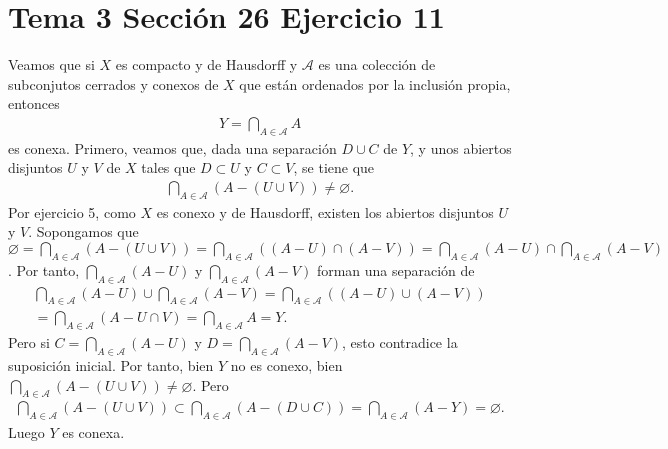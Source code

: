 \documentclass{article}
\begin{document}
\section{Tema 3 Sección 26 Ejercicio 11}
Veamos que si $X$ es compacto y de Hausdorff y $\mathcal{A}$ es una colección de subconjutos cerrados y conexos de $X$ que están ordenados por la inclusión propia, entonces 
\begin{eqnarray}
Y=\bigcap_{A\in \mathcal{A}}A\nonumber
\end{eqnarray}
es conexa. Primero, veamos que, dada una separación $D\cup C$ de $Y$, y unos abiertos disjuntos $U$ y $V$ de $X$ tales que $D\subset U$ y $C\subset V$, se tiene que
\begin{eqnarray}
\bigcap_{A\in \mathcal{A}}\left(A-\left(U\cup V\right)\right)\neq \varnothing.\nonumber
\end{eqnarray}
Por ejercicio 5, como $X$ es conexo y de Hausdorff, existen los abiertos disjuntos $U$ y $V$. Sopongamos que $\varnothing=\bigcap_{A\in \mathcal{A}}\left(A-\left(U\cup V\right)\right)=\bigcap_{A\in \mathcal{A}}\left(\left(A-U\right)\cap \left(A-V\right)\right)=\bigcap_{A\in \mathcal{A}}\left(A-U\right)\cap \bigcap_{A\in \mathcal{A}}\left(A-V\right)$. Por tanto, $\bigcap_{A\in \mathcal{A}}\left(A-U\right)$ y $ \bigcap_{A\in \mathcal{A}}\left(A-V\right)$ forman una separación de
\begin{eqnarray}
\bigcap_{A\in \mathcal{A}}\left(A-U\right)\cup \bigcap_{A\in \mathcal{A}}\left(A-V\right)=\bigcap_{A\in \mathcal{A}}\left(\left(A-U\right)\cup \left(A-V\right)\right)
\nonumber\\
=\bigcap_{A\in \mathcal{A}}\left(A-U\cap V\right)=\bigcap_{A\in \mathcal{A}}A=Y.\nonumber
\end{eqnarray}
Pero si $C=\bigcap_{A\in \mathcal{A}}\left(A-U\right)$ y $D=\bigcap_{A\in \mathcal{A}}\left(A-V\right)$, esto contradice la suposición inicial. Por tanto, bien $Y$ no es conexo, bien $\bigcap_{A\in \mathcal{A}}\left(A-\left(U\cup V\right)\right)\neq \varnothing$. Pero
\begin{eqnarray}
\bigcap_{A\in \mathcal{A}}\left(A-\left(U\cup V\right)\right)\subset \bigcap_{A\in \mathcal{A}}\left(A-\left(D\cup C\right)\right)=\bigcap_{A\in \mathcal{A}}\left(A-Y\right)=\varnothing.\nonumber
\end{eqnarray}
Luego $Y$ es conexa.
\end{document}
